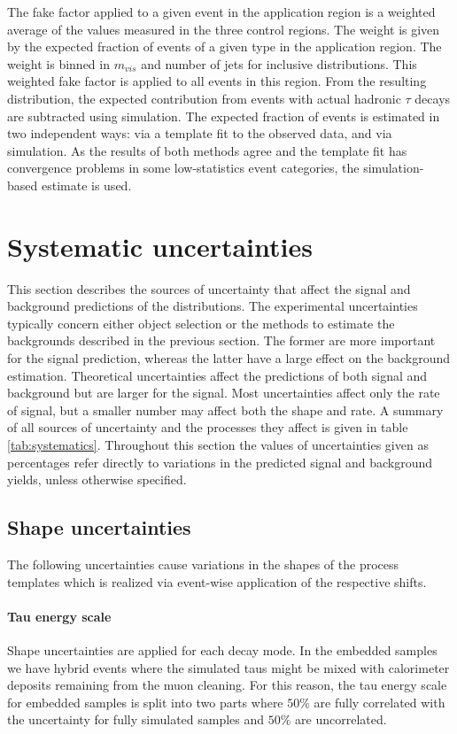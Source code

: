 The fake factor applied to a given event in the application region is a weighted average of the values measured in the three control regions. The weight is given by the expected fraction of events of a given type in the application region. The weight is binned in $m_{vis}$ and number of jets for inclusive distributions. This weighted fake factor is applied to all events in this region. From the resulting distribution, the expected contribution from events with actual hadronic $\tau$ decays are subtracted using simulation. The expected fraction of events is estimated in two independent ways: via a template fit to the observed data, and via simulation. As the results of both methods agree and the template fit has convergence problems in some low-statistics event categories, the simulation-based estimate is used.

\section{Systematic uncertainties}
\label{sec:analysis_systematics}

This section describes the sources of uncertainty that affect the signal and background predictions of the \mttot distributions. The experimental uncertainties typically concern either object selection or the methods to estimate the backgrounds described in the previous section. The former are more important for the signal prediction, whereas the latter have a large effect on the background estimation. Theoretical uncertainties affect the predictions of both signal and background but are larger for the signal. Most uncertainties affect only the rate of signal, but a smaller number may affect both the shape and rate. A summary of all sources of uncertainty and the processes they affect is given in table \ref{tab:systematics}. Throughout this section the values of uncertainties given as percentages refer directly to variations in the predicted signal and background yields, unless otherwise specified.

\subsection{Shape uncertainties}
The following uncertainties cause variations in the shapes of the process templates which is realized via event-wise application of the respective shifts.

\paragraph{Tau energy scale} Shape uncertainties are applied for each decay mode. In the embedded samples we have hybrid events where the simulated taus might be mixed with calorimeter deposits remaining from the muon cleaning. For this reason, the tau energy scale for embedded samples is split into two parts where $50\%$ are fully correlated with the uncertainty for fully simulated samples and $50\%$ are uncorrelated.

